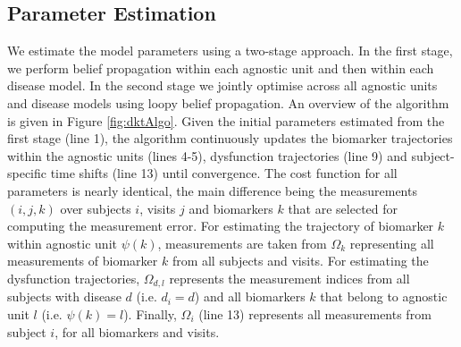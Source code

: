 \documentclass{llncs}
\begin{document}
%


\subsection{Parameter Estimation}

\newcommand{\uu}{^{(u)}}
\newcommand{\um}{^{(u-1)}}

We estimate the model parameters using a two-stage approach. In the first stage, we perform belief propagation within each agnostic unit and then within each disease model. In the second stage we jointly optimise across all agnostic units and disease models using loopy belief propagation. An overview of the algorithm is given in Figure \ref{fig:dktAlgo}. Given the initial parameters estimated from the first stage (line 1), the algorithm continuously updates the biomarker trajectories within the agnostic units (lines 4-5), dysfunction trajectories (line 9) and subject-specific time shifts (line 13) until convergence. The cost function for all parameters is nearly identical, the main difference being the measurements $(i,j,k)$ over subjects $i$, visits $j$ and biomarkers $k$ that are selected for computing the measurement error. For estimating the trajectory of biomarker $k$ within agnostic unit $\psi(k)$, measurements are taken from $\Omega_k$ representing all measurements of biomarker $k$ from all subjects and visits. For estimating the dysfunction trajectories, $\Omega_{d,l}$ represents the measurement indices from all subjects with disease $d$ (i.e. $d_i = d$) and all biomarkers $k$ that belong to agnostic unit $l$ (i.e. $\psi(k) = l$). Finally, $\Omega_i$ (line 13) represents all measurements from subject $i$, for all biomarkers and visits. 
\end{document}
